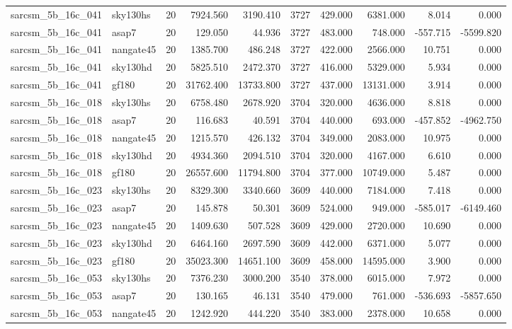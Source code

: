 \begin{tabular}{llrrrrrrrr}
sarcsm\_5b\_16c\_041 & sky130hs & 20 & 7924.560 & 3190.410 & 3727 & 429.000 & 6381.000 & 8.014 & 0.000 \\
sarcsm\_5b\_16c\_041 & asap7 & 20 & 129.050 & 44.936 & 3727 & 483.000 & 748.000 & -557.715 & -5599.820 \\
sarcsm\_5b\_16c\_041 & nangate45 & 20 & 1385.700 & 486.248 & 3727 & 422.000 & 2566.000 & 10.751 & 0.000 \\
sarcsm\_5b\_16c\_041 & sky130hd & 20 & 5825.510 & 2472.370 & 3727 & 416.000 & 5329.000 & 5.934 & 0.000 \\
sarcsm\_5b\_16c\_041 & gf180 & 20 & 31762.400 & 13733.800 & 3727 & 437.000 & 13131.000 & 3.914 & 0.000 \\
sarcsm\_5b\_16c\_018 & sky130hs & 20 & 6758.480 & 2678.920 & 3704 & 320.000 & 4636.000 & 8.818 & 0.000 \\
sarcsm\_5b\_16c\_018 & asap7 & 20 & 116.683 & 40.591 & 3704 & 440.000 & 693.000 & -457.852 & -4962.750 \\
sarcsm\_5b\_16c\_018 & nangate45 & 20 & 1215.570 & 426.132 & 3704 & 349.000 & 2083.000 & 10.975 & 0.000 \\
sarcsm\_5b\_16c\_018 & sky130hd & 20 & 4934.360 & 2094.510 & 3704 & 320.000 & 4167.000 & 6.610 & 0.000 \\
sarcsm\_5b\_16c\_018 & gf180 & 20 & 26557.600 & 11794.800 & 3704 & 377.000 & 10749.000 & 5.487 & 0.000 \\
sarcsm\_5b\_16c\_023 & sky130hs & 20 & 8329.300 & 3340.660 & 3609 & 440.000 & 7184.000 & 7.418 & 0.000 \\
sarcsm\_5b\_16c\_023 & asap7 & 20 & 145.878 & 50.301 & 3609 & 524.000 & 949.000 & -585.017 & -6149.460 \\
sarcsm\_5b\_16c\_023 & nangate45 & 20 & 1409.630 & 507.528 & 3609 & 429.000 & 2720.000 & 10.690 & 0.000 \\
sarcsm\_5b\_16c\_023 & sky130hd & 20 & 6464.160 & 2697.590 & 3609 & 442.000 & 6371.000 & 5.077 & 0.000 \\
sarcsm\_5b\_16c\_023 & gf180 & 20 & 35023.300 & 14651.100 & 3609 & 458.000 & 14595.000 & 3.900 & 0.000 \\
sarcsm\_5b\_16c\_053 & sky130hs & 20 & 7376.230 & 3000.200 & 3540 & 378.000 & 6015.000 & 7.972 & 0.000 \\
sarcsm\_5b\_16c\_053 & asap7 & 20 & 130.165 & 46.131 & 3540 & 479.000 & 761.000 & -536.693 & -5857.650 \\
sarcsm\_5b\_16c\_053 & nangate45 & 20 & 1242.920 & 444.220 & 3540 & 383.000 & 2378.000 & 10.658 & 0.000 \\

\end{tabular}

